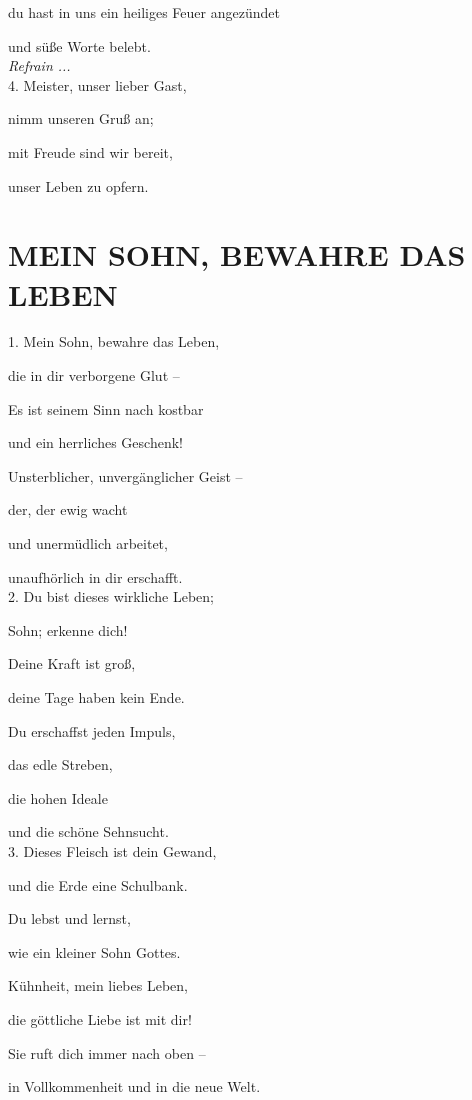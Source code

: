 \documentclass[11pt,a5paper,twoside]{article}
\begin{document}
du hast in uns ein heiliges Feuer angezündet

und süße Worte belebt.\\
 

\textit{Refrain ...}\\


4. Meister, unser lieber Gast, 

nimm unseren Gruß an; 

mit Freude sind wir bereit, 

unser Leben zu opfern.

\section[Mein Sohn, bewahre das Leben]{MEIN SOHN, BEWAHRE DAS LEBEN}

1. Mein Sohn, bewahre das Leben, 

die in dir verborgene Glut --

Es ist seinem Sinn nach kostbar

und ein herrliches Geschenk! 

Unsterblicher, unvergänglicher Geist --

der, der ewig wacht 

und unermüdlich arbeitet,

unaufhörlich in dir erschafft.\\
 
2. Du bist dieses wirkliche Leben; 

Sohn; erkenne dich! 

Deine Kraft ist groß,

deine Tage haben kein Ende. 

Du erschaffst jeden Impuls, 

das edle Streben, 

die hohen Ideale 

und die schöne Sehnsucht.\\

3. Dieses Fleisch ist dein Gewand,

und die Erde eine Schulbank.

Du lebst und lernst, 
 
wie ein kleiner Sohn Gottes. 

Kühnheit, mein liebes Leben,

die göttliche Liebe ist mit dir! 

Sie ruft dich immer nach oben --

in Vollkommenheit und in die neue Welt.
\end{document}
